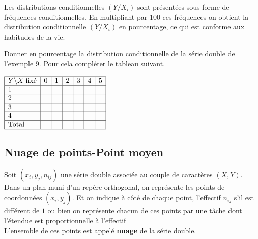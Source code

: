 \begin{remark}
Les distributions conditionnelles $(Y / X _i )$ sont
présentées sous forme de fréquences
conditionnelles. En multipliant par 100 ces
fréquences on obtient la distribution conditionnelle
$(Y / X _i )$ en pourcentage, ce qui est conforme aux
habitudes de la vie.
\end{remark}
\begin{exercice}
Donner en pourcentage la distribution conditionnelle de la série double de l’exemple 9. Pour cela compléter le tableau suivant.


$
\begin{array}{|l|c|c|c|c|c|c|}
\hline
Y \backslash X\; \text{fixé} & 0 & 1 & 2 & 3 & 4 & 5  \\
\hline
1 &  &  &  &  &  &    \\
\hline
2 &  &  & &  &  &   \\
\hline
3 &  &  &  &  &  &    \\
\hline
4 &  &  &  &  &  &    \\
\hline
\text{Total} &  &  &  &  &  &    \\
\hline
\end{array}
$


\end{exercice}
\subsection{Nuage de points-Point moyen}
Soit $(x_i ,y_j ,n_{ij} )$ une série double associée au couple
de caractères $(X,Y)$.  Dans un plan muni d’un repère
orthogonal, on représente les points de
coordonnées $(x_i ,y_j )$. Et on indique à côté de chaque
point, l’effectif $n_{ij}$ s’il est différent de $1$ ou bien on
représente chacun de ces points par une tâche dont
l’étendue est proportionnelle à l’effectif\\
L’ensemble de ces points est appelé \textbf{nuage} de
la série double.

